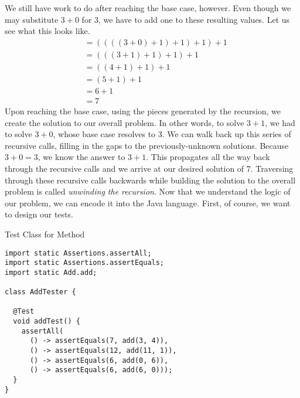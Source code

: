 We still have work to do after reaching the base case, however. Even though we may substitute $3+0$ for $3$, we have to add one to these resulting values. Let us see what this looks like.
\begin{align*}
    &= ((((3 + 0) + 1) + 1) + 1) + 1\\
    &= (((3 + 1) + 1) + 1) + 1\\
    &= ((4 + 1) + 1) + 1\\
    &= (5 + 1) + 1\\
    &= 6 + 1\\
    &= 7
\end{align*}
Upon reaching the base case, using the pieces generated by the recursion, we create the solution to our overall problem. In other words, to solve $3 + 1$, we had to solve $3 + 0$, whose base case resolves to $3$. We can walk back up this series of recursive calls, filling in the gaps to the previously-unknown solutions. Because $3 + 0 = 3$, we know the answer to $3 + 1$. This propagates all the way back through the recursive calls and we arrive at our desired solution of $7$. Traversing through these recursive calls backwards while building the solution to the overall problem is called \textit{unwinding the recursion}. Now that we understand the logic of our problem, we can encode it into the Java language. First, of course, we want to design our tests.

\begin{cl}[]{Test Class for  Method}
\begin{lstlisting}[language=MyJava]
import static Assertions.assertAll;
import static Assertions.assertEquals;
import static Add.add;

class AddTester {
  
  @Test
  void addTest() {
    assertAll(
      () -> assertEquals(7, add(3, 4)),
      () -> assertEquals(12, add(11, 1)),
      () -> assertEquals(6, add(0, 6)),
      () -> assertEquals(6, add(6, 0)));
  }
}
\end{lstlisting}
\end{cl}

